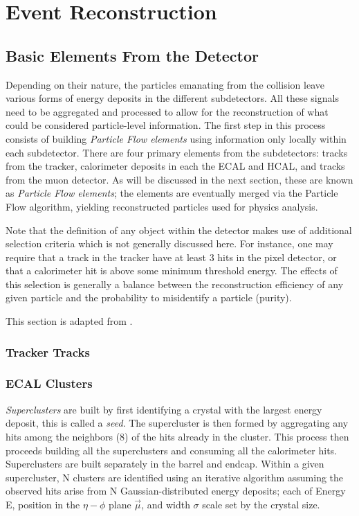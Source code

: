 \chapter{Event Reconstruction}
\label{chap:eventreco}

\section{Basic Elements From the Detector} 

Depending on their nature, the particles emanating from the collision leave various forms of energy deposits in the different subdetectors. All these signals need to be aggregated and processed to allow for the reconstruction of what could be considered particle-level information. The first step in this process consists of building \textit{Particle Flow elements} using information only locally within each subdetector. There are four primary elements from the subdetectors: tracks from the tracker, calorimeter deposits in each the ECAL and HCAL, and tracks from the muon detector. As will be discussed in the next section, these are known as \textit{Particle Flow elements}; the elements are eventually merged via the Particle Flow algorithm, yielding reconstructed particles used for physics analysis.

Note that the definition of any object within the detector makes use of additional selection criteria which is not generally discussed here. For instance, one may require that a track in the tracker have at least 3 hits in the pixel detector, or that a calorimeter hit is above some minimum threshold energy. The effects of this selection is generally a balance between the reconstruction efficiency of any given particle and the probability to misidentify a particle (purity).

This section is adapted from \cite{CMS-PRF-14-001}.

\subsection{Tracker Tracks}

\subsection{ECAL Clusters}

\textit{Superclusters} are built by first identifying a crystal with the largest energy deposit, this is called a \textit{seed}. The supercluster is then formed by aggregating any hits among the neighbors (8) of the hits already in the cluster. This process then proceeds building all the superclusters and consuming all the calorimeter hits. Superclusters are built separately in the barrel and endcap. Within a given supercluster, N clusters are identified using an iterative algorithm assuming the observed hits arise from N Gaussian-distributed energy deposits; each of Energy E, position in the $\eta-\phi$ plane $\vec{\mu}$, and width $\sigma$ scale set by the crystal size.

